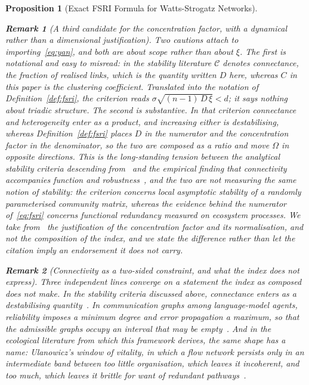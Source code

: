 \documentclass[11pt,a4paper]{article}
\newtheorem{proposition}{Proposition}
\newtheorem{remark}{Remark}
\begin{document}
\begin{proposition}[Exact FSRI Formula for Watts-Strogatz Networks]
\begin{remark}[A third candidate for the concentration factor, with a
dynamical rather than a dimensional justification]
Two cautions attach to importing~\eqref{eq:yan}, and both are about scope
rather than about $\xi$. The first is notational and easy to misread: in the
stability literature $\mathcal{C}$ denotes \emph{connectance}, the fraction of
realised links, which is the quantity written $D$ here, whereas $C$ in this
paper is the clustering coefficient. Translated into the notation of
Definition~\ref{def:fsri}, the criterion reads
$\sigma\sqrt{(n-1)\,D\,\xi} < d$; it says nothing about triadic structure. The
second is substantive. In that criterion connectance and heterogeneity enter
as a \emph{product}, and increasing either is destabilising, whereas
Definition~\ref{def:fsri} places $D$ in the numerator and the concentration
factor in the denominator, so the two are composed as a ratio and move
$\Omega$ in opposite directions. This is the long-standing tension between the
analytical stability criteria descending from~\cite{may1972,allesina2012} and
the empirical finding that connectivity accompanies function and
robustness~\cite{wagg2019,morrien2017,yuan2021}, and the two are not
measuring the same notion of stability: the criterion concerns local
asymptotic stability of a randomly parameterised community matrix, whereas the
evidence behind the numerator of~\eqref{eq:fsri} concerns functional
redundancy measured on ecosystem processes. We take from~\cite{yan2017} the
justification of the concentration factor and its normalisation, and not the
composition of the index, and we state the difference rather than let the
citation imply an endorsement it does not carry.
\end{remark}

\begin{remark}[Connectivity as a two-sided constraint, and what the index does
not express]
\label{rem:window}
Three independent lines converge on a statement the index as composed does not
make. In the stability criteria discussed above, connectance enters as a
destabilising quantity~\cite{may1972,allesina2012,yan2017}. In communication
graphs among language-model agents, reliability imposes a minimum degree and
error propagation a maximum, so that the admissible graphs occupy an interval
that may be empty~\cite{niu2026}. And in the ecological literature from which
this framework derives, the same shape has a name: Ulanowicz's window of
vitality, in which a flow network persists only in an intermediate band between
too little organisation, which leaves it incoherent, and too much, which leaves
it brittle for want of redundant pathways~\cite{ulanowicz2009}.


\end{remark}
\end{proposition}
\end{document}
